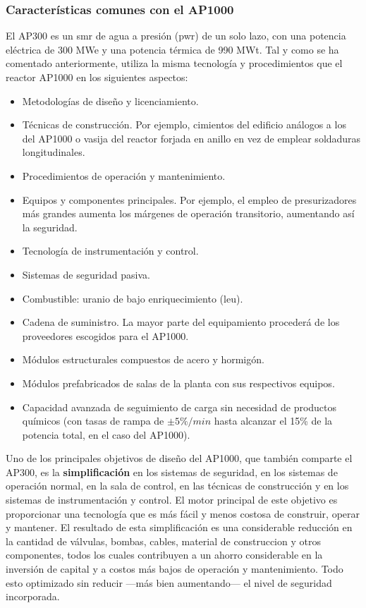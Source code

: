 \subsubsection{Características comunes con el AP1000}

El AP300 es un \acrshort{smr} de agua a presión (\acrshort{pwr}) de un solo lazo, con una potencia eléctrica de 300 MWe y una potencia térmica de 990 MWt. Tal y como se ha comentado anteriormente, utiliza la misma tecnología y procedimientos que el reactor AP1000 en los siguientes aspectos: 

\begin{itemize}
  \item Metodologías de diseño y licenciamiento.
  \item Técnicas de construcción. Por ejemplo, cimientos del edificio análogos a los del AP1000 o vasija del reactor forjada en anillo en vez de emplear soldaduras longitudinales.
  \item Procedimientos de operación y mantenimiento.
  \item Equipos y componentes principales. Por ejemplo, el empleo de presurizadores más grandes aumenta los márgenes de operación transitorio, aumentando así la seguridad.
  \item Tecnología de instrumentación y control.
  \item Sistemas de seguridad pasiva.
  \item Combustible: uranio de bajo enriquecimiento (\acrshort{leu}).
  \item Cadena de suministro. La mayor parte del equipamiento procederá de los proveedores escogidos para el AP1000.
  \item Módulos estructurales compuestos de acero y hormigón.
  \item Módulos prefabricados de salas de la planta con sus respectivos equipos.
  \item Capacidad avanzada de seguimiento de carga sin necesidad de productos químicos (con tasas de rampa de $\pm5\%/min$ hasta alcanzar el 15\% de la potencia total, en el caso del AP1000).
\end{itemize}
Uno de los principales objetivos de diseño del AP1000, que también comparte el AP300, es la \textbf{simplificación} en los sistemas de seguridad, en los sistemas de operación normal, en la sala de control, en las técnicas de construcción y en los sistemas de instrumentación y control. El motor principal de este objetivo es proporcionar una tecnología que es más fácil y menos costosa de construir, operar y mantener. El resultado de esta simplificación es una considerable reducción en la cantidad de válvulas, bombas, cables, material de construccion y otros componentes, todos los cuales contribuyen a un ahorro considerable en la inversión de capital y a costos más bajos de operación y mantenimiento. Todo esto optimizado sin reducir ---más bien aumentando--- el nivel de seguridad incorporada.

